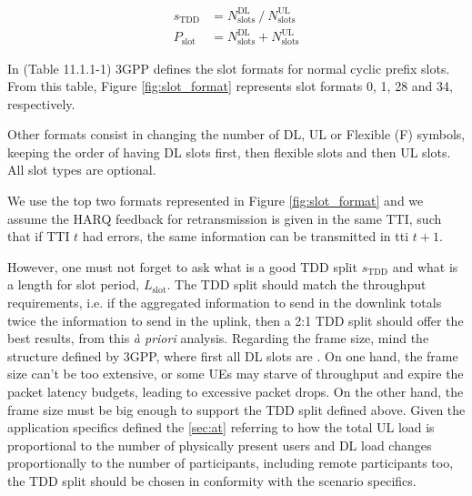 \begin{align}
    s_\text{TDD} &= N^\text{DL}_\text{slots} \ / \ N^\text{UL}_\text{slots} \label{eq:tdd_split} \\
    P_\text{slot} &= N^\text{DL}_\text{slots} + N^\text{UL}_\text{slots} \label{eq:slot_per}
\end{align}


In \cite{3gpp-frames_and_slots} (Table 11.1.1-1) 3GPP defines the slot formats for normal cyclic prefix slots. From this table, Figure \ref{fig:slot_format} represents slot formats 0, 1, 28 and 34, respectively. 



Other formats consist in changing the number of DL, UL or Flexible (F) symbols, keeping the order of having DL slots first, then flexible slots and then UL slots. All slot types are optional.

We use the top two formats represented in Figure \ref{fig:slot_format} and we assume the HARQ feedback for retransmission is given in the same TTI, such that if TTI $t$ had errors, the same information can be transmitted in tti $t+1$. 



However, one must not forget to ask what is a good TDD split $s_\text{TDD}$ and what is a length for slot period, $L_\text{slot}$. The TDD split should match the throughput requirements, i.e. if the aggregated information to send in the downlink totals twice the information to send in the uplink, then a 2:1 TDD split should offer the best results, from this \textit{à priori} analysis. Regarding the frame size, mind the structure defined by 3GPP, where first all DL slots are . On one hand, the frame size can't be too extensive, or some UEs may starve of throughput and expire the packet latency budgets, leading to excessive packet drops. On the other hand, the frame size must be big enough to support the TDD split defined above. Given the application specifics defined the \ref{sec:at} referring to how the total UL load is proportional to the number of physically present users and DL load changes proportionally to the number of participants, including remote participants too, the TDD split should be chosen in conformity with the scenario specifics. 


